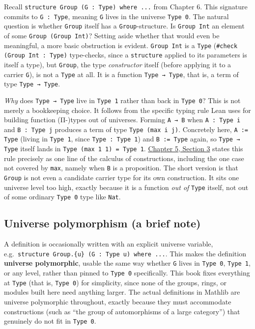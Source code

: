 Recall \texttt{structure Group (G : Type) where ...} from Chapter 6. This signature commits to \texttt{G : Type}, meaning \texttt{G} lives in the universe \texttt{Type 0}. The natural question is whether \texttt{Group} itself has a \texttt{Group}-structure. Is \texttt{Group Int} an element of some \texttt{Group (Group Int)}? Setting aside whether that would even be meaningful, a more basic obstruction is evident. \texttt{Group Int} is a \texttt{Type} (\texttt{\#check (Group Int : Type)} type-checks, since a \texttt{structure} applied to its parameters is itself a type), but \texttt{Group}, the type \emph{constructor} itself (before applying it to a carrier \texttt{G}), is not a \texttt{Type} at all. It is a function \texttt{Type → Type}, that is, a term of type \texttt{Type → Type}.

\emph{Why} does \texttt{Type → Type} live in \texttt{Type 1} rather than back in \texttt{Type 0}? This is not merely a bookkeeping choice. It follows from the specific typing rule Lean uses for building function (Π-)types out of universes. Forming \texttt{A → B} when \texttt{A : Type i} and \texttt{B : Type j} produces a term of type \texttt{Type (max i j)}. Concretely here, \texttt{A := Type} (living in \texttt{Type 1}, since \texttt{Type : Type 1}) and \texttt{B := Type} again, so \texttt{Type → Type} itself lands in \texttt{Type (max 1 1) = Type 1}. \hyperref[sec:05-rigor-check:03-typing-rules-and-safety:1]{Chapter 5, Section 3} states this rule precisely as one line of the calculus of constructions, including the one case not covered by \texttt{max}, namely when \texttt{B} is a proposition. The short version is that \texttt{Group} is not even a candidate carrier type for its own construction. It sits one universe level too high, exactly because it is a function \emph{out of} \texttt{Type} itself, not out of some ordinary \texttt{Type 0} type like \texttt{Nat}.

\subsection{Universe polymorphism (a brief note)}\label{sec:05-rigor-check:02-universes:4}

A definition is occasionally written with an explicit universe variable, e.g.~\texttt{structure Group.\{u\} (G : Type u) where ...}. This makes the definition \textbf{universe polymorphic}, usable the same way whether \texttt{G} lives in \texttt{Type 0}, \texttt{Type 1}, or any level, rather than pinned to \texttt{Type 0} specifically. This book fixes everything at \texttt{Type} (that is, \texttt{Type 0}) for simplicity, since none of the groups, rings, or modules built here need anything larger. The actual definitions in Mathlib are universe polymorphic throughout, exactly because they must accommodate constructions (such as ``the group of automorphisms of a large category'') that genuinely do not fit in \texttt{Type 0}.

